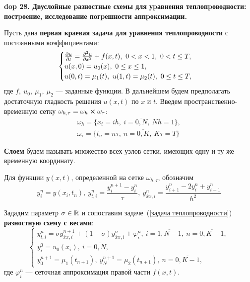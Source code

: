 \setcounter{section}{4}
\setcounter{subsection}{28}
\setcounter{equation}{0}
\textbf{\LARGE dop 28. Двуслойные pазностные схемы для уpавнения теплопpоводности: постpоение, исследование погpешности аппpоксимации.}

\newcommand{\ddev}[1]{#1_{\overline{x}x,i}}
\newcommand{\deln}[3]{\frac{\partial^{#3} #1}{\partial #2^{#3}}}

\begin{Commentwhite}
Пусть дана \textbf{первая краевая задача для уравнения теплопроводности} с постоянными коэффициентами:
\begin{equation}
    \label{задача теплопроводности}
    \begin{cases}
        \frac{\partial u}{\partial t} = \frac{\partial^2 u}{\partial x^2} + f(x, t),~0 < x < 1,~0 < t \le T,
        \\
        u(x, 0) = u_0(x),~0 \le x \le 1,
        \\
        u(0, t) = \mu_1(t),~u(1, t) = \mu_2(t),~0 \le t \le T,
    \end{cases}
\end{equation}
где $f,~u_0,~\mu_1,~\mu_2$ --- заданные функции. В дальнейшем будем предполагать достаточную гладкость решения $u(x,t)$ по $x$ и $t$. Введем пространственно-временную сетку $\omega_{h,\tau} = \omega_h \cross \omega_{\tau}$:
\begin{gather*}
    \omega_h = \{ x_i = ih,~i=\overline{0,N},~Nh = 1 \},
    \\
    \omega_\tau = \{ t_n = n\tau,~n=\overline{0,K},~K\tau = T \}
\end{gather*}

\begin{definition}
\textbf{Слоем} будем называть множество всех узлов сетки, имеющих одну и ту же временную координату.
\end{definition}

Для функции $y(x, t)$, определенной на сетке $\omega_{h,\tau}$, обозначим
$$y_i^n = y(x_i, t_n),~y_{t,i}^n = \frac{y_i^{n+1} - y_i^n}{\tau},~\ddev{y}^n = \frac{y_{i+1}^n - 2y_i^n + y_{i-1}^n}{h^2}$$

Зададим параметр $\sigma\in{\mathbb{R}}$ и сопоставим задаче~(\ref{задача теплопроводности}) \textbf{разностную схему с весами}:
\begin{equation}
    \label{двуслойная схема с весами}
    \begin{cases}
        y_{t,i}^n = \sigma \ddev{y}^{n+1} + (1 - \sigma)\ddev{y}^n + \varphi_i^n,~i=\overline{1,N-1},~n=\overline{0,K-1},
        \\
        y_i^0 = u_0(x_i),~i=\overline{0,N},
        \\
        y_0^{n+1} = \mu_1(t_{n+1}),~y_N^{n+1} = \mu_2(t_{n+1}),~n=\overline{0,K-1},
    \end{cases}
\end{equation}
где $\varphi_i^n$ --- сеточная аппроксимация правой части $f(x,t)$.


\end{Commentwhite}
